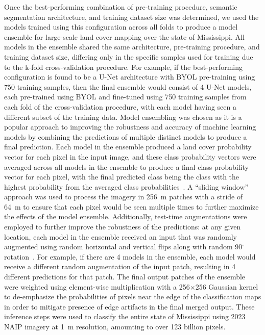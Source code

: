 Once the best-performing combination of pre-training procedure, semantic segmentation architecture, and training dataset size was determined, we used the models trained using this configuration across all folds to produce a model ensemble for large-scale land cover mapping over the state of Mississippi.
All models in the ensemble shared the same architecture, pre-training procedure, and training dataset size, differing only in the specific samples used for training due to the k-fold cross-validation procedure.
For example, if the best-performing configuration is found to be a U-Net architecture with BYOL pre-training using 750 training samples, then the final ensemble would consist of 4 U-Net models, each pre-trained using BYOL and fine-tuned using 750 training samples from each fold of the cross-validation procedure, with each model having seen a different subset of the training data.
Model ensembling was chosen as it is a popular approach to improving the robustness and accuracy of machine learning models by combining the predictions of multiple distinct models to produce a final prediction.
Each model in the ensemble produced a land cover probability vector for each pixel in the input image, and these class probability vectors were averaged across all models in the ensemble to produce a final class probability vector for each pixel, with the final predicted class being the class with the highest probability from the averaged class probabilities~\citep{marmanisSemanticSegmentationAerial2016}.
A ``sliding window'' approach was used to process the imagery in \SI{256}{\meter} patches with a stride of \SI{64}{\meter} to ensure that each pixel would be seen multiple times to further maximize the effects of the model ensemble.
Additionally, test-time augmentations were employed to further improve the robustness of the predictions: at any given location, each model in the ensemble received an input that was randomly augmented using random horizontal and vertical flips along with random 90\(^\circ\) rotation~\citep{moshkovTesttimeAugmentationDeep2020}.
For example, if there are 4 models in the ensemble, each model would receive a different random augmentation of the input patch, resulting in 4 different predictions for that patch.
The final output patches of the ensemble were weighted using element-wise multiplication with a 256\(\times\)256 Gaussian kernel to de-emphasize the probabilities of pixels near the edge of the classification maps in order to mitigate presence of edge artifacts in the final merged output.
These inference steps were used to classify the entire state of Mississippi using 2023 NAIP imagery at \SI{1}{\meter} resolution, amounting to over 123 billion pixels.
